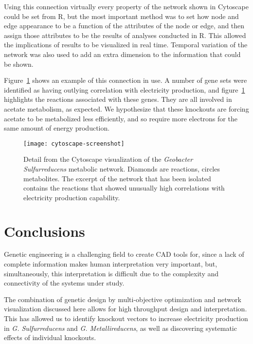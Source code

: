 \documentclass[a4paper,twocolumn]{article}
\begin{document}
Using this connection virtually every property of the network shown in Cytoscape could be set from R, but the most important method was to set how node and edge appearance to be a function of the attributes of the node or edge, and then assign those attributes to be the results of analyses conducted in R. This allowed the implications of results to be visualized in real time. Temporal variation of the network was also used to add an extra dimension to the information that could be shown.

Figure~\ref{fig:cytoscape-screenshot} shows an example of this connection in use. A number of gene sets were identified as having outlying correlation with electricity production, and figure~\ref{fig:cytoscape-screenshot} highlights the reactions associated with these genes. They are all involved in acetate metabolism, as expected. We hypothesize that these knockouts are forcing acetate to be metabolized less efficiently, and so require more electrons for the same amount of energy production.

\begin{figure}[!htb]
\texttt{[image: cytoscape-screenshot]}
\caption{Detail from the Cytoscape visualization of the {\it Geobacter Sulfurreducens} metabolic network. Diamonds are reactions, circles metabolites. The excerpt of the network that has been isolated contains the reactions that showed unusually high correlations with electricity production capability.}
\label{fig:cytoscape-screenshot}
\end{figure}

\section{Conclusions}

Genetic engineering is a challenging field to create CAD tools for, since a lack of complete information makes human interpretation very important, but, simultaneously, this interpretation is difficult due to the complexity and connectivity of the systems under study. 


The combination of genetic design by multi-objective optimization and network visualization discussed here allows for high throughput design and interpretation. This has allowed us to identify knockout vectors to increase electricity production in {\it G. Sulfurreducens} and {\it G. Metallireducens}, as well as discovering systematic effects of individual knockouts.
\end{document}
